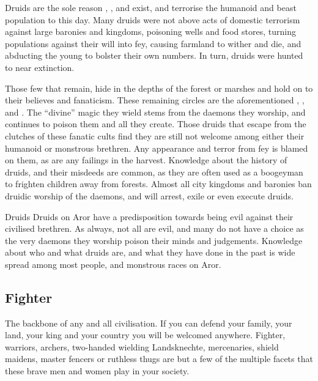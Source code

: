 Druids are the sole reason , ,
and  exist, and terrorise the humanoid and beast
population to this day. Many druids were not above acts of domestic terrorism
against large baronies and kingdoms, poisoning wells and food stores, turning
populations against their will into fey, causing farmland to wither and die,
and abducting the young to bolster their own numbers. In turn, druids were
hunted to near extinction.

Those few that remain, hide in the depths of the forest or marshes and hold on
to their believes and fanaticism. These remaining circles are the
aforementioned , ,
 and . The ``divine'' magic they
wield stems from the daemons they worship, and continues to poison them and
all they create. Those druids that escape from the clutches of these fanatic
cults find they are still not welcome among either their humanoid or monstrous
brethren. Any appearance and terror from fey is blamed on them, as are any
failings in the harvest. Knowledge about the history of druids, and their
misdeeds are common, as they are often used as a boogeyman to frighten
children away from forests. Almost all city kingdoms and baronies ban druidic
worship of the daemons, and will arrest, exile or even execute druids.


\begin{35e}{Druids}
  Druids on Aror have a predisposition towards being evil against their
  civilised brethren. As always, not all are evil, and many do not have a
  choice as the very daemons they worship poison their minds and judgements.
  Knowledge about who and what druids are, and what they have done in the
  past is wide spread among most people, and monstrous races on Aror.
\end{35e}

\subsection{Fighter}
\label{sec:Fighter}

The backbone of any and all civilisation. If you can defend your family, your
land, your king and your country you will be welcomed anywhere. Fighter,
warriors, archers, two-handed wielding Landsknechte, mercenaries, shield
maidens, master fencers or ruthless thugs are but a few of the multiple
facets that these brave men and women play in your society.

